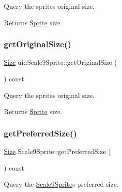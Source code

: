 Query the sprite\textquotesingle{}s original size. 

\begin{DoxyReturn}{Returns}
\hyperlink{classSprite}{Sprite} size. 
\end{DoxyReturn}
\mbox{\label{classui_1_1Scale9Sprite_a11b3114a2b81650e5e1ab153fef7eaaa}} 
\subsubsection{\texorpdfstring{get\+Original\+Size()}{getOriginalSize()}\hspace{0.1cm}{\footnotesize\ttfamily [2/2]}}
{\footnotesize\ttfamily \hyperlink{classSize}{Size} ui\+::\+Scale9\+Sprite\+::get\+Original\+Size (\begin{DoxyParamCaption}{ }\end{DoxyParamCaption}) const}



Query the sprite\textquotesingle{}s original size. 

\begin{DoxyReturn}{Returns}
\hyperlink{classSprite}{Sprite} size. 
\end{DoxyReturn}
\mbox{\label{classui_1_1Scale9Sprite_abbcebd3c0338291ff887b98399133384}} 
\subsubsection{\texorpdfstring{get\+Preferred\+Size()}{getPreferredSize()}\hspace{0.1cm}{\footnotesize\ttfamily [1/2]}}
{\footnotesize\ttfamily \hyperlink{classSize}{Size} Scale9\+Sprite\+::get\+Preferred\+Size (\begin{DoxyParamCaption}{ }\end{DoxyParamCaption}) const}



Query the \hyperlink{classui_1_1Scale9Sprite}{Scale9\+Sprite}\textquotesingle{}s preferred size. 

